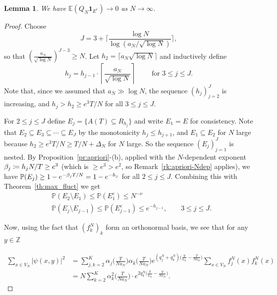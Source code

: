 \documentclass[11pt,a4paper,reqno]{amsart}
\newtheorem{Lemma}[Theorem]{Lemma}
\theoremstyle{definition}
\newcommand{\bbE}{{\ensuremath{\mathbb E}} }
\newcommand{\bbP}{{\ensuremath{\mathbb P}} }
\newcommand{\bbZ}{{\ensuremath{\mathbb Z}} }
\begin{document}
\begin{Lemma}
\label{clm:Q on Ec}
We have $\bbE(Q_N \mathbf{1}_{E^c}) \to 0$ as $N \to \infty$.
\end{Lemma}
\begin{proof}
Choose 
\[ J =  3 + \bigg\lceil \frac{\log N}{\log ( a_N / \sqrt{\log N } ) } \bigg\rceil , \]
so that $( \frac{a_N}{\sqrt{\log N} } )^{J-3} \geq N$.
Let $h_2 = \lceil a_N \sqrt{\log N } \rceil$ and inductively define 
$$ h_j = h_{j-1} \cdot \left \lceil \frac{ a_N}{ \sqrt{ \log N } } \right \rceil \qquad 
\mbox{ for } 3 \leq j \leq J . $$
Note that, since we assumed that $a_N \gg \log N$, the sequence $(h_j)_{j=2}^J  $ is increasing,
and $h_j > h_2 \geq e^3 T / N$ for all $3 \leq j \leq J$.

For $2 \leq j \leq J$ define $E_j = \{ A(T) \subseteq R_{h_j} \}$ and write $E_1 = E$ for consistency. Note that $E_2 \subseteq E_3 \subseteq \cdots \subseteq E_J$ by the monotonicity $h_j \leq h_{j+1}$, and $E_1 \subseteq E_2$ for $N$ large because $h_2 \geq e^3 T/N \geq T/N + \Delta_N$ for $N$ large. So the sequence $(E_j)_{j=1}^J$ is nested.
By Proposition~\ref{pr:apriori}-(b), applied with the $N$-dependent exponent $\beta_j \coloneqq h_j N/T \geq e^3$ (which is $\geq e^3 > e^2$, so Remark~\ref{rk:apriori-Ndep} applies), we have $\bbP(E_j) \geq 1 - e^{-\b_j T/N} = 1 - e^{-h_j}$ for all $2 \leq j \leq J$.
Combining this with Theorem~\ref{th:max_fluct} we get
	\[ \begin{split} 
	& \bbP(E_2 \setminus E_1 )  \leq \bbP (E_1^c ) \leq N^{-\nu} 
	\\  
	& \bbP(E_j \setminus E_{j-1}  )  \leq \bbP (E_{j-1}^c ) \leq e^{-h_{j-1} } , \qquad 
	3\leq j \leq J. 
	\end{split} \] 
	
Now, using the fact that $(f^N_k)_k$ form an orthonormal basis, we see that for any $y \in \bbZ$

	\begin{align} \label{eqn:psi squared}
		\sum_{x \in V_N} |\psi(x,y)|^2 
		& = \sum_{j,k=2}^K \alpha_j \Big( \frac{T}{Na_N} \Big) \alpha_k \Big( \frac{T}{Na_N} \Big) 
		e^{(q_j^N + q_k^N) \big( \frac{y}{a_N} - \frac{T}{N a_N} \big)} 
		\sum_{x \in V_N} f_j^N(x) f_k^N(x) \nonumber \\
		& = N \sum_{k=2}^K \alpha_k^2\!\Big( \frac{T}{Na_N} \Big) 
		\cdot e^{2 q_k^N \big( \frac{y}{a_N} - \frac{T}{N a_N} \big) } .
	\end{align}


\end{proof}
\end{document}
